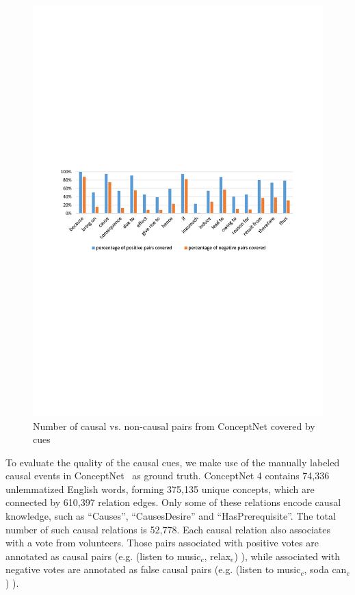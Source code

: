 \documentclass[letterpaper]{article}
\begin{document}
\begin{figure}[th]
\centering
\includegraphics[width=1.6\columnwidth]{pattern2}
\caption{Number of causal vs. non-causal pairs from ConceptNet covered by cues}
\label{fig:pattern2}
\end{figure}
To evaluate the quality of the causal cues, we make use of the
manually labeled causal events in
ConceptNet~\cite{liu2004commonsense} as ground truth. ConceptNet 4
contains 74,336 unlemmatized English words, forming
375,135 unique concepts, which are connected by 610,397 relation edges.
Only some of these relations encode causal knowledge,
such as ``Causes'', ``CausesDesire'' and ``HasPrerequisite''.
The total number of such causal relations is 52,778.
Each causal relation also associates with a vote from volunteers.
Those pairs associated with positive votes are annotated as causal pairs
(e.g. (listen to music$_c$, relax$_e$) ),
while associated with negative votes are annotated as false causal pairs
(e.g. (listen to music$_c$, soda can$_e$) ).
\end{document}
